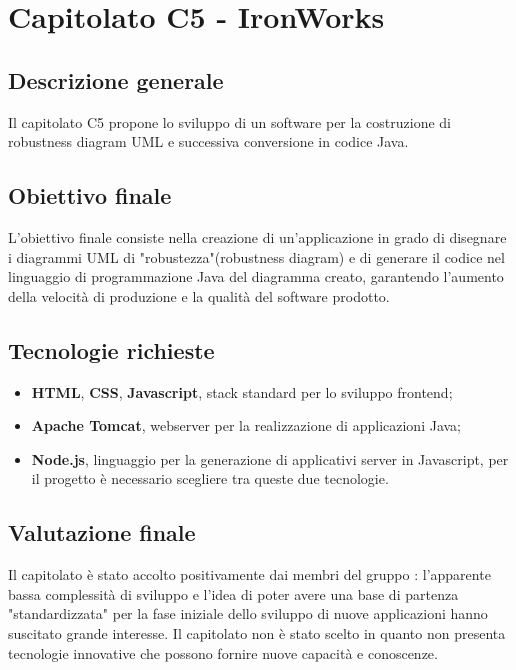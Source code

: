 \documentclass[StudioDiFattibilità.tex]{subfiles}
\begin{document}
\chapter{Capitolato C5 - IronWorks}
\section{Descrizione generale}
Il capitolato C5 propone lo sviluppo di un software
per la costruzione di robustness diagram UML e successiva conversione in codice Java.
\section{Obiettivo finale}
L'obiettivo finale consiste nella creazione di un'applicazione in grado di disegnare i diagrammi UML di "robustezza"(robustness diagram) e di generare il codice nel linguaggio di programmazione Java del diagramma creato, garantendo l'aumento della velocità di produzione e la qualità del software prodotto.
\section{Tecnologie richieste}
\begin{itemize}
	\item \textbf{HTML}, \textbf{CSS}, \textbf{Javascript}, stack standard per lo sviluppo frontend;
	\item \textbf{Apache Tomcat}, webserver per la realizzazione di applicazioni Java;
	\item \textbf{Node.js}, linguaggio per la generazione di applicativi server in Javascript, per il progetto è necessario scegliere tra queste due tecnologie.
\end{itemize}
\section{Valutazione finale}
Il capitolato è stato accolto positivamente dai membri del gruppo \gruppo: l'apparente bassa complessità di sviluppo e l'idea di poter avere una base di partenza "standardizzata" per la fase iniziale dello sviluppo di nuove applicazioni hanno suscitato grande interesse. Il capitolato non è stato scelto in quanto non presenta tecnologie innovative che possono fornire nuove capacità e conoscenze.
\end{document}
